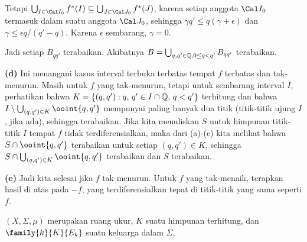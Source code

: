 {     
\noindent Tetapi
$\bigcup_{I\in\Cal I_0}f^*(I)\subseteq\bigcup_{J\in\Cal J_0}f^*(J)$,
karena setiap anggota $\Cal I_0$ termasuk dalam suatu anggota
$\Cal J_0$, sehingga $\gamma q'\le q(\gamma+\epsilon)$ dan
$\gamma\le \epsilon q/(q'-q)$. Karena $\epsilon$ sembarang, $\gamma=0$.
     
Jadi setiap $B_{qq'}$ terabaikan. Akibatnya
$B=\bigcup_{q,q'\in\Bbb Q,0\le q<q'}B_{qq'}$ terabaikan.
     
\medskip
     
{\bf (d)} Ini menangani kasus interval terbuka terbatas tempat $f$
terbatas dan tak-menurun. Masih untuk $f$ yang tak-menurun, tetapi untuk
sembarang interval $I$, perhatikan bahwa
$K=\{(q,q'):q,\,q'\in I\cap\Bbb Q,\,q<q'\}$ terhitung dan bahwa
$I\setminus\bigcup_{(q,q')\in K}\ooint{q,q'}$ mempunyai paling banyak
dua titik (titik-titik ujung $I$, jika ada), sehingga terabaikan. Jika
kita menuliskan $S$ untuk himpunan titik-titik $I$ tempat $f$ tidak
terdiferensialkan, maka dari (a)-(c) kita melihat bahwa
$S\cap\ooint{q,q'}$ terabaikan untuk setiap $(q,q')\in K$, sehingga
$S\cap\bigcup_{(q,q')\in K}\ooint{q,q'}$ terabaikan dan $S$ terabaikan.
     
\medskip
     
{\bf (e)} Jadi kita selesai jika $f$ tak-menurun. Untuk $f$ yang
tak-menaik, terapkan hasil di atas pada $-f$, yang terdiferensialkan
tepat di titik-titik yang sama seperti $f$.
}%
     
$(X,\Sigma,\mu)$ merupakan ruang ukur, $K$ suatu himpunan terhitung,
dan $\family{k}{K}{E_k}$ suatu keluarga dalam $\Sigma$,
     
     
